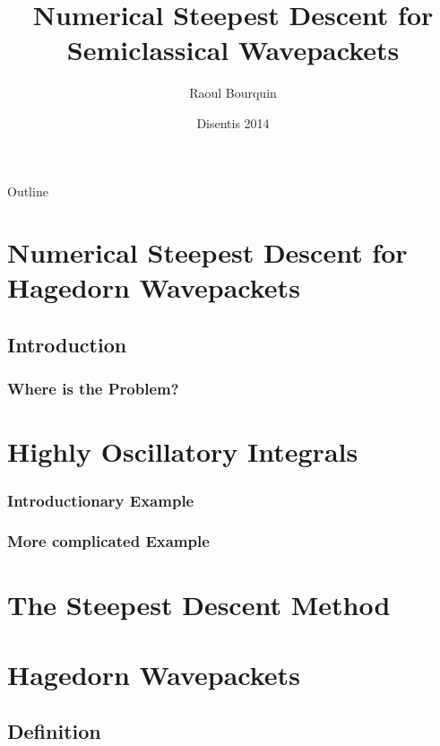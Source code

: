 \documentclass{beamer}
\title[Wavepackets]{Numerical Steepest Descent for\\ Semiclassical Wavepackets}
\author[]{Raoul Bourquin}
\date{Disentis 2014}
\begin{document}
\begin{frame}
  \titlepage
\end{frame}

\begin{frame}{Outline}
  \tableofcontents
\end{frame}

\section{Numerical Steepest Descent for Hagedorn Wavepackets}

\subsection{Introduction}
\subsubsection{Where is the Problem?}


\section{Highly Oscillatory Integrals}
\subsubsection{Introductionary Example}


\subsubsection{More complicated Example}



\section{The Steepest Descent Method}




\section{Hagedorn Wavepackets}
\subsection{Definition}
\end{document}
